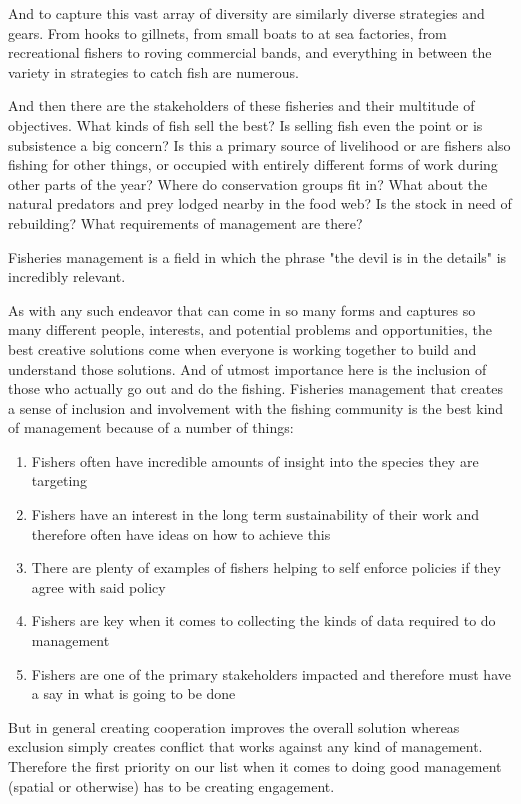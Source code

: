 \documentclass[11pt]{article}
\begin{document}
And to capture this vast array of diversity are similarly diverse strategies and gears. From hooks to gillnets, from small boats to at sea factories, from recreational fishers to roving commercial bands, and everything in between the variety in strategies to catch fish are numerous. 

And then there are the stakeholders of these fisheries and their multitude of objectives. What kinds of fish sell the best? Is selling fish even the point or is subsistence a big concern? Is this a primary source of livelihood or are fishers also fishing for other things, or occupied with entirely different forms of work during other parts of the year? Where do conservation groups fit in? What about the natural predators and prey lodged nearby in the food web? Is the stock in need of rebuilding? What requirements of management are there? 

Fisheries management is a field in which the phrase "the devil is in the details" is incredibly relevant. \newline

As with any such endeavor that can come in so many forms and captures so many different people, interests, and potential problems and opportunities, the best creative solutions come when everyone is working together to build and understand those solutions. And of utmost importance here is the inclusion of those who actually go out and do the fishing. Fisheries management that creates a sense of inclusion and involvement with the fishing community is the best kind of management because of a number of things:

\begin{enumerate}
\item Fishers often have incredible amounts of insight into the species they are targeting 
\item Fishers have an interest in the long term sustainability of their work and therefore often have ideas on how to achieve this
\item There are plenty of examples of fishers helping to self enforce policies if they agree with said policy
\item Fishers are key when it comes to collecting the kinds of data required to do management
\item Fishers are one of the primary stakeholders impacted and therefore must have a say in what is going to be done
\end{enumerate}

But in general creating cooperation improves the overall solution whereas exclusion simply creates conflict that works against any kind of management. Therefore the first priority on our list when it comes to doing good management (spatial or otherwise) has to be creating engagement. \newline
\end{document}
